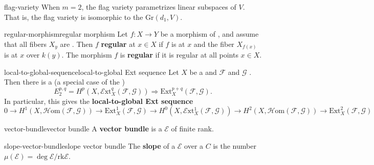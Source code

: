 \begin{example}{flag-variety}
    When $m = 2$, the flag variety parametrizes linear subspaces of $V$. That is, the flag variety is isomorphic to the  $\text{Gr}(d_1, V)$.
\end{example}

\begin{topic}{regular-morphism}{regular morphism}
    Let $f : X \to Y$ be a morphism of , and assume that all fibers $X_y$ are . Then $f$ \textbf{regular} at $x \in X$ if $f$ is  at $x$ and the fiber $X_{f(x)}$ is  at $x$ over $k(y)$. The morphism $f$ is \textbf{regular} if it is regular at all points $x \in X$.
\end{topic}

\begin{topic}{local-to-global-sequence}{local-to-global Ext sequence}
    Let $X$ be a  and $\mathcal{F}$ and $\mathcal{G}$ . Then there is a  (a special case of the )
    \[ E_2^{p, q} = H^p(X, \mathcal{E}\text{xt}_X^q(\mathcal{F}, \mathcal{G})) \Rightarrow \text{Ext}_X^{p + q}(\mathcal{F}, \mathcal{G}) . \]
    In particular, this gives the \textbf{local-to-global Ext sequence}
    \[ 0 \to H^1(X, \mathcal{H}\text{om}(\mathcal{F}, \mathcal{G})) \to \text{Ext}_X^1(\mathcal{F}, \mathcal{G}) \to H^0(X, \mathcal{E}\text{xt}_X^1(\mathcal{F}, \mathcal{G})) \to H^2(X, \mathcal{H}\text{om}(\mathcal{F}, \mathcal{G})) \to \text{Ext}_X^2(\mathcal{F}, \mathcal{G}) \]
\end{topic}

\begin{topic}{vector-bundle}{vector bundle}
    A \textbf{vector bundle} is a  $\mathcal{E}$ of finite rank.
\end{topic}

\begin{topic}{slope-vector-bundle}{slope vector bundle}
    The \textbf{slope} of a  $\mathcal{E}$ over a  $C$ is the number $\mu(\mathcal{E}) = \deg \mathcal{E} / \text{rk} \mathcal{E}$.
\end{topic}

